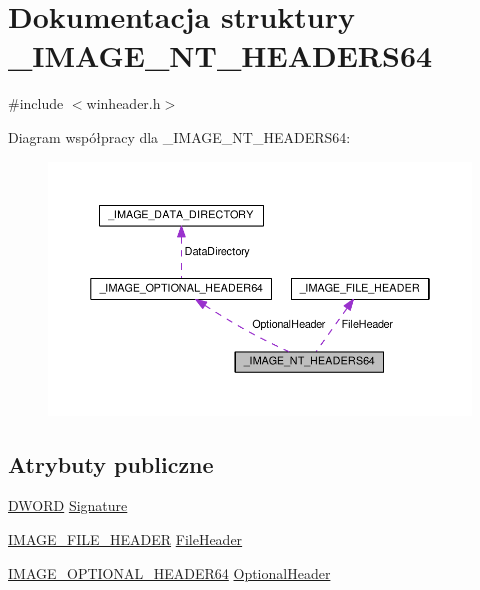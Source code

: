 \hypertarget{struct___i_m_a_g_e___n_t___h_e_a_d_e_r_s64}{\section{Dokumentacja struktury \-\_\-\-I\-M\-A\-G\-E\-\_\-\-N\-T\-\_\-\-H\-E\-A\-D\-E\-R\-S64}
\label{struct___i_m_a_g_e___n_t___h_e_a_d_e_r_s64}
}


{\ttfamily \#include $<$winheader.\-h$>$}



Diagram współpracy dla \-\_\-\-I\-M\-A\-G\-E\-\_\-\-N\-T\-\_\-\-H\-E\-A\-D\-E\-R\-S64\-:
\nopagebreak
\begin{figure}[H]
\begin{center}
\leavevmode
\includegraphics[width=350pt]{struct___i_m_a_g_e___n_t___h_e_a_d_e_r_s64__coll__graph}
\end{center}
\end{figure}
\subsection*{Atrybuty publiczne}
\begin{DoxyCompactItemize}
\item 
\hyperlink{winheader_8h_af483253b2143078cede883fc3c111ad2}{D\-W\-O\-R\-D} \hyperlink{struct___i_m_a_g_e___n_t___h_e_a_d_e_r_s64_a846d3eb78fd95dc71db36e89269d81cb}{Signature}
\item 
\hyperlink{winheader_8h_ab18994ab54fdb55d1542f30b3895ab10}{I\-M\-A\-G\-E\-\_\-\-F\-I\-L\-E\-\_\-\-H\-E\-A\-D\-E\-R} \hyperlink{struct___i_m_a_g_e___n_t___h_e_a_d_e_r_s64_a90697a3d56043dee58cbf21b30363863}{File\-Header}
\item 
\hyperlink{winheader_8h_a955345df2edf902d02dabe2aa7a82495}{I\-M\-A\-G\-E\-\_\-\-O\-P\-T\-I\-O\-N\-A\-L\-\_\-\-H\-E\-A\-D\-E\-R64} \hyperlink{struct___i_m_a_g_e___n_t___h_e_a_d_e_r_s64_a50eaffc01bf927048dc730c15b5ed3f1}{Optional\-Header}
\end{DoxyCompactItemize}


